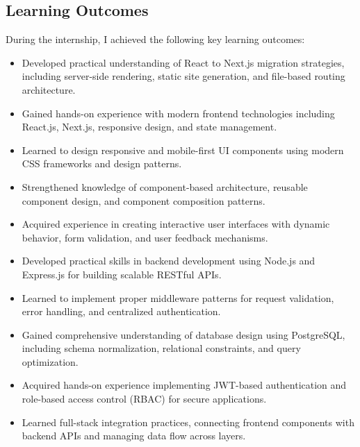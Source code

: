 \subsection{Learning Outcomes}

During the internship, I achieved the following key learning outcomes:

\begin{itemize}

\item Developed practical understanding of React to Next.js migration strategies, including server-side rendering, static site generation, and file-based routing architecture.

\item Gained hands-on experience with modern frontend technologies including React.js, Next.js, responsive design, and state management.

\item Learned to design responsive and mobile-first UI components using modern CSS frameworks and design patterns.

\item Strengthened knowledge of component-based architecture, reusable component design, and component composition patterns.

\item Acquired experience in creating interactive user interfaces with dynamic behavior, form validation, and user feedback mechanisms.

\item Developed practical skills in backend development using Node.js and Express.js for building scalable RESTful APIs.

\item Learned to implement proper middleware patterns for request validation, error handling, and centralized authentication.

\item Gained comprehensive understanding of database design using PostgreSQL, including schema normalization, relational constraints, and query optimization.

\item Acquired hands-on experience implementing JWT-based authentication and role-based access control (RBAC) for secure applications.

\item Learned full-stack integration practices, connecting frontend components with backend APIs and managing data flow across layers.


\end{itemize}
